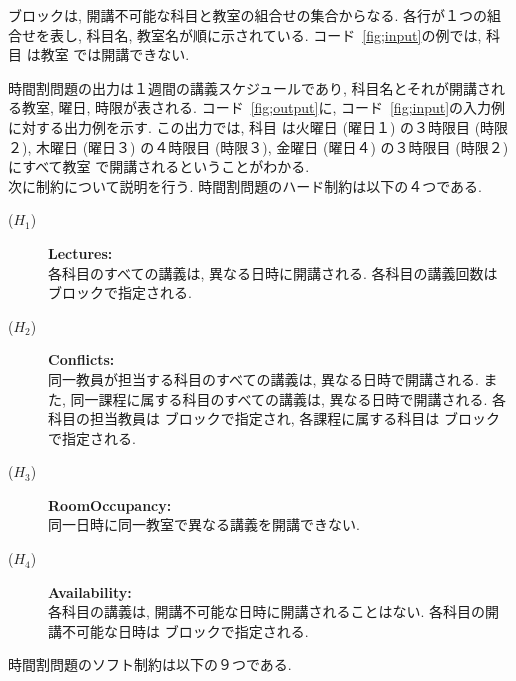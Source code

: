  ブロックは, 開講不可能な科目と教室の組合せの集合からなる. 各行が１つの組合せを表し, 科目名, 教室名が順に示されている. コード~\ref{fig;input}の例では, 科目  は教室  では開講できない.

時間割問題の出力は１週間の講義スケジュールであり, 科目名とそれが開講される教室, 曜日, 時限が表される. コード~\ref{fig;output}に, コード~\ref{fig;input}の入力例に対する出力例を示す. この出力では, 科目  は火曜日 (曜日１) の３時限目 (時限２), 木曜日 (曜日３) の４時限目 (時限３), 金曜日 (曜日４) の３時限目 (時限２) にすべて教室  で開講されるということがわかる.\\

次に制約について説明を行う. 時間割問題のハード制約は以下の４つである.

\begin{description}
\item[($H_1$)] \textbf{Lectures:}\\
各科目のすべての講義は, 異なる日時に開講される. 各科目の講義回数は  ブロックで指定される.
\item[($H_2$)] \textbf{Conflicts:}\\
同一教員が担当する科目のすべての講義は, 異なる日時で開講される. また, 同一課程に属する科目のすべての講義は, 異なる日時で開講される. 各科目の担当教員は  ブロックで指定され, 各課程に属する科目は  ブロックで指定される.
\item[($H_3$)] \textbf{RoomOccupancy:}\\
同一日時に同一教室で異なる講義を開講できない.
\item[($H_4$)] \textbf{Availability:}\\
各科目の講義は, 開講不可能な日時に開講されることはない. 各科目の開講不可能な日時は  ブロックで指定される.
\end{description}

時間割問題のソフト制約は以下の９つである.

